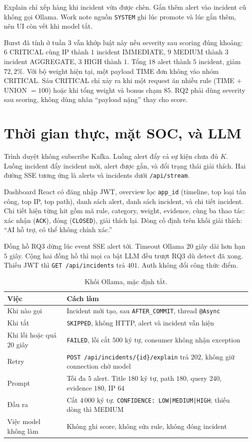 \documentclass[a4paper,11pt]{article}
\begin{document}
Explain chỉ xếp hàng khi incident vừa được chèn. Gắn thêm alert vào incident cũ không gọi Ollama. Work note nguồn \texttt{SYSTEM} ghi lúc promote và lúc gắn thêm, nên UI còn vết khi model tắt.

Burst đã tính ở tuần 3 vẫn khớp luật này nếu severity sau scoring đúng khoảng: $6$ CRITICAL cùng IP thành $1$ incident IMMEDIATE, $9$ MEDIUM thành $3$ incident AGGREGATE, $3$ HIGH thành $1$. Tổng $18$ alert thành $5$ incident, giảm $72{,}2\%$. Với bộ weight hiện tại, một payload TIME đơn không vào nhóm CRITICAL. Sáu CRITICAL chỉ xảy ra khi một request ăn nhiều rule (TIME $+$ UNION $= 100$) hoặc khi tổng weight và bonus chạm $85$. RQ2 phải dùng severity sau scoring, không dùng nhãn ``payload nặng'' thay cho score.

\section{Thời gian thực, mặt SOC, và LLM}

Trình duyệt không subscribe Kafka. Luồng alert đẩy cả sự kiện chưa đủ $K$. Luồng incident đẩy incident mới, alert được gắn, và đổi trạng thái giải thích. Hai đường SSE tương ứng là alerts và incidents dưới \texttt{/api/stream}.

Dashboard React có đăng nhập JWT, overview lọc \texttt{app\_id} (timeline, top loại tấn công, top IP, top path), danh sách alert, danh sách incident, và chi tiết incident. Chi tiết hiện từng hit gồm mã rule, category, weight, evidence, cùng ba thao tác: xác nhận (\texttt{ACK}), đóng (\texttt{CLOSED}), giải thích lại. Dòng cố định trên khối giải thích: ``AI hỗ trợ, có thể không chính xác.''

Đồng hồ RQ3 dừng lúc event SSE alert tới. Timeout Ollama $20$ giây dài hơn hạn $5$ giây. Cộng hai đồng hồ thì mọi ca bật LLM đều trượt RQ3 dù detect đã xong. Thiếu JWT thì \texttt{GET /api/incidents} trả $401$. Auth không đổi công thức điểm.

\begin{table}[ht]
\centering
\caption{Khối Ollama, mặc định tắt.}
\label{tab:llm}
\small
\begin{tabularx}{\linewidth}{@{}p{3.3cm}Y@{}}
\toprule
Việc & Cách làm \\
\midrule
Khi nào gọi & Incident mới tạo, sau \texttt{AFTER\_COMMIT}, thread \texttt{@Async} \\
Khi tắt & \texttt{SKIPPED}, không HTTP, alert và incident vẫn hiện \\
Khi lỗi hoặc quá $20$ giây & \texttt{FAILED}, lỗi cắt $500$ ký tự, consumer không nhận exception \\
Retry & \texttt{POST /api/incidents/\{id\}/explain} trả $202$, không giữ connection chờ model \\
Prompt & Tối đa $5$ alert. Title $180$ ký tự, path $180$, query $240$, evidence $180$, IP $64$ \\
Đầu ra & Cắt $4\,000$ ký tự. \texttt{CONFIDENCE: LOW|MEDIUM|HIGH}; thiếu dòng thì MEDIUM \\
Việc model không làm & Không ghi score, không sửa rule, không đóng incident \\
\bottomrule
\end{tabularx}
\end{table}
\end{document}
